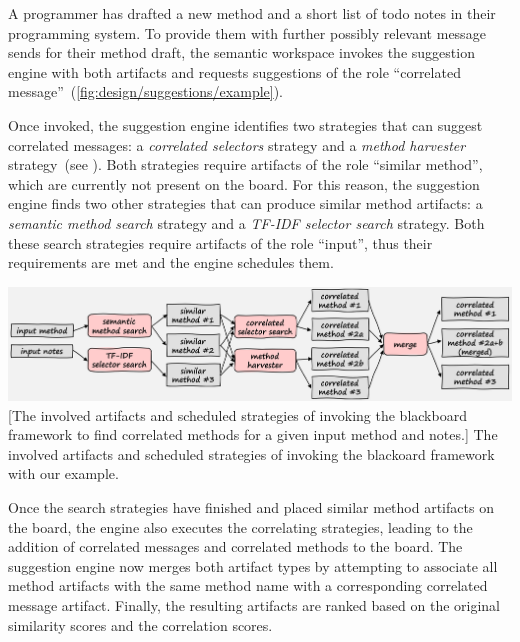 \begin{example}
	A programmer has drafted a new method and a short list of todo notes in their programming system.
	To provide them with further possibly relevant message sends for their method draft, the semantic workspace invokes the suggestion engine with both artifacts and requests suggestions of the role ``correlated message''~(\cref{fig:design/suggestions/example}).

	Once invoked, the suggestion engine identifies two strategies that can suggest correlated messages: a \emph{correlated selectors} strategy and a \emph{method harvester} strategy~(see ).
	Both strategies require artifacts of the role ``similar method'', which are currently not present on the board.
	For this reason, the suggestion engine finds two other strategies that can produce similar method artifacts: a \emph{semantic method search} strategy and a \emph{TF-IDF selector search} strategy.
	Both these search strategies require artifacts of the role ``input'', thus their requirements are met and the engine schedules them.

	\vspace{\baselineskip}
	\begin{center}
		\includegraphics[width=\textwidth]{02_suggestions/example.png}
		[The involved artifacts and scheduled strategies of invoking the blackboard framework to find correlated methods for a given input method and notes.]{
			The involved artifacts and scheduled strategies of invoking the blackoard framework with our example.
		}
		\label{fig:design/suggestions/example}
	\end{center}

	Once the search strategies have finished and placed similar method artifacts on the board, the engine also executes the correlating strategies, leading to the addition of correlated messages and correlated methods to the board.
	The suggestion engine now merges both artifact types by attempting to associate all method artifacts with the same method name with a corresponding correlated message artifact.
	Finally, the resulting artifacts are ranked based on the original similarity scores and the correlation scores.
\end{example}

